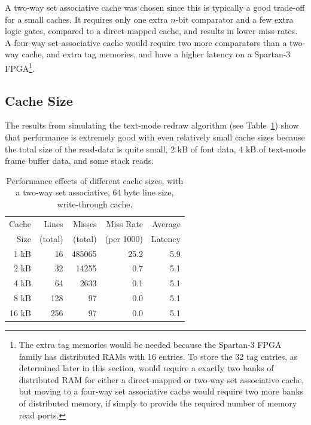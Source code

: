 A two-way set associative cache was chosen since this is typically a good
trade-off for a small caches. It requires only one extra $n$-bit comparator and a
few extra logic gates, compared to a direct-mapped cache, and results in lower
miss-rates\cite{parhami2005cam}. A four-way set-associative cache would require
two more comparators than a two-way cache, and extra tag memories, and have a
higher latency on a Spartan-3 FPGA\footnote{The extra tag memories would be
needed because the Spartan-3 FPGA family has distributed RAMs with 16 entries. To
store the 32 tag entries, as determined later in this section, would require a
exactly two banks of distributed RAM for either a direct-mapped or two-way set
associative cache, but moving to a four-way set associative cache would require
two more banks of distributed memory, if simply to provide the required number of
memory read ports.}.



\subsection{Cache Size}
The results from simulating the text-mode redraw algorithm (see
Table~\ref{Mem_Cache_Size}) show that performance is extremely good with even
relatively small cache sizes because the total size of the read-data is quite
small, 2 kB of font data, 4 kB of text-mode frame buffer data, and some stack
reads.

\begin{table}[h!]
\begin{center}
\begin{tabular}{ r  r  r  r  r }
Cache & Lines   & Misses  & Miss Rate  & Average \\
Size  & (total) & (total) & (per 1000) & Latency \\
\hline
1 kB  &  16 & 485065 & 25.2 & 5.9 \\
2 kB  &  32 &  14255 &  0.7 & 5.1 \\
4 kB  &  64 &   2633 &  0.1 & 5.1 \\
8 kB  & 128 &     97 &  0.0 & 5.1 \\
16 kB & 256 &     97 &  0.0 & 5.1 \\
\end{tabular}
\caption[Cache size vs. performance]{Performance effects of different cache
sizes, with a two-way set associative, 64 byte line size, write-through cache.}
\label{Mem_Cache_Size}
\end{center}
\end{table}

